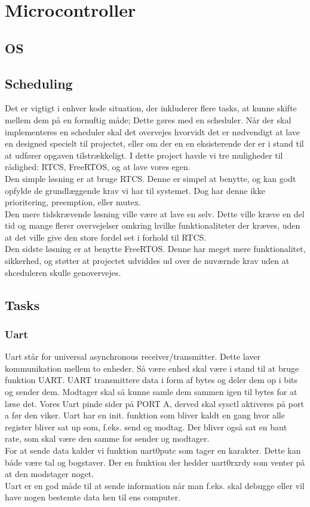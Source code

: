 \section{Microcontroller}

\subsection{OS}
\subsection{Scheduling}
Det er vigtigt i enhver kode situation, der inkluderer flere tasks, at kunne skifte mellem dem på en fornuftig måde; Dette gøres med en scheduler. Når der skal implementeres en scheduler skal det overvejes hvorvidt det er nødvendigt at lave en designed specielt til projectet, eller om der en en eksisterende der er i stand til at udfører opgaven tilstrækkeligt. I dette project havde vi tre muligheder til rådighed: RTCS, FreeRTOS, og at lave vores egen.
\\
Den simple løsning er at bruge RTCS. Denne er simpel at benytte, og kan godt opfylde de grundlæggende krav vi har til systemet. Dog har denne ikke prioritering, preemption, eller mutex.
\\
Den mere tidskrævende løsning ville være at lave en selv. Dette ville kræve en del tid og mange flerer overvejelser omkring hvilke funktionaliteter der kræves, uden at det ville give den store fordel set i forhold til RTCS.
\\
Den sidste løsning er at benytte FreeRTOS. Denne har meget mere funktionalitet, sikkerhed, og støtter at projectet udviddes ud over de nuværnde krav uden at shceduleren skulle genovervejes.
\subsection{Tasks}

\subsubsection{Uart}

Uart står for universal asynchronous receiver/transmitter. Dette laver kommunikation mellem to enheder. Så være enhed skal være i stand til at bruge funktion UART. UART transmittere data i form af bytes og deler dem op i bits og sender dem. Modtager skal så kunne samle dem sammen igen til bytes for at læse det.
Vores Uart pinde sider på PORT A, derved skal sysctl aktiveres på port a før den viker. Uart har en init. funktion som bliver kaldt en gang hvor alle register bliver sat up som, f.eks. send og modtag. Der bliver også sat en baut rate, som skal være den samme for sender og modtager.
\\
For at sende data kalder vi funktion uart0\textunderscore putc som tager en karakter. Dette kan både være tal og bogstaver. Der en funktion der hedder uart0\textunderscore rx\textunderscore rdy som venter på at den modstager noget.
\\
Uart er en god måde til at sende information når man f.eks. skal debugge eller vil have nogen bestemte data hen til ens computer.

